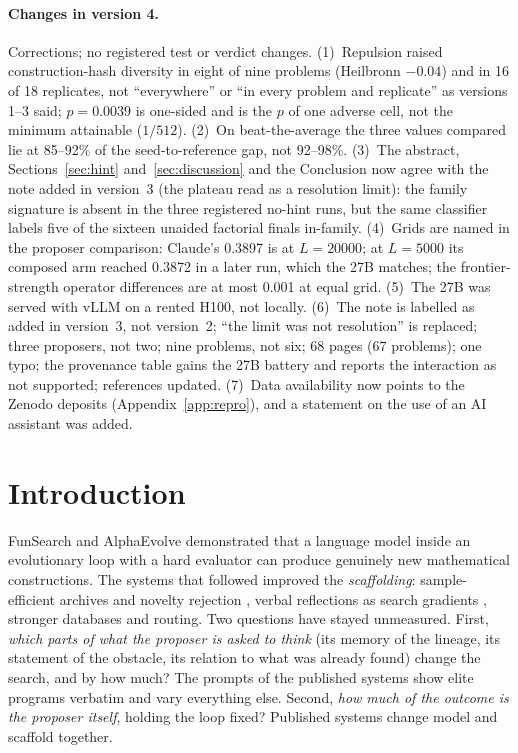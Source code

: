 \documentclass[11pt]{article}
\begin{document}
{\small
\paragraph{Changes in version 4.} Corrections; no registered test or
verdict changes. (1)~Repulsion raised construction-hash diversity in
eight of nine problems (Heilbronn $-0.04$) and in 16 of 18 replicates,
not ``everywhere'' or ``in every problem and replicate'' as versions 1--3
said; $p=0.0039$ is one-sided and is the $p$ of one adverse cell, not
the minimum attainable ($1/512$). (2)~On beat-the-average the three
values compared lie at 85--92\% of the seed-to-reference gap, not
92--98\%. (3)~The abstract, Sections~\ref{sec:hint}
and~\ref{sec:discussion} and the Conclusion now agree with the note
added in version~3 (the plateau read as a resolution limit): the family
signature is absent in the three registered no-hint runs, but the same
classifier labels five of the sixteen unaided factorial finals
in-family. (4)~Grids are named in the proposer comparison: Claude's
0.3897 is at $L{=}20000$; at $L{=}5000$ its composed arm reached 0.3872
in a later run, which the 27B matches; the frontier-strength operator
differences are at most 0.001 at equal grid. (5)~The 27B was served with
vLLM on a rented H100, not locally. (6)~The note is labelled as added in
version~3, not version~2; ``the limit was not resolution'' is replaced;
three proposers, not two; nine problems, not six; 68 pages (67
problems); one typo; the provenance table gains the 27B battery and
reports the interaction as not supported; references updated.
(7)~Data availability now points to the Zenodo deposits
(Appendix~\ref{app:repro}), and a statement on the use of an AI
assistant was added.\par}

\section{Introduction}
\label{sec:intro}

FunSearch \citep{romeraparedes2024funsearch} and AlphaEvolve
\citep{novikov2025alphaevolve} demonstrated that a language model inside an
evolutionary loop with a hard evaluator can produce genuinely new
mathematical constructions. The systems that followed improved the
\emph{scaffolding}: sample-efficient archives and novelty rejection
\citep{lange2025shinka}, verbal reflections as search gradients
\citep{ye2024reevo}, stronger databases and routing. Two questions have
stayed unmeasured. First, \emph{which parts of what the proposer is asked
to think} (its memory of the lineage, its statement of the obstacle, its
relation to what was already found) change the search, and by how much?
The prompts of the published systems show elite programs verbatim and vary
everything else. Second, \emph{how much of the outcome is the proposer
itself}, holding the loop fixed? Published systems change model and
scaffold together.
\end{document}
